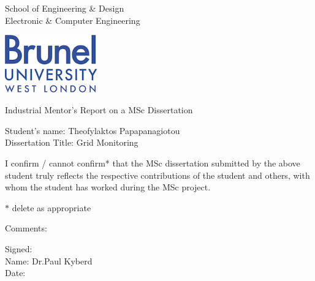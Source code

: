 \newpage
\thispagestyle{empty}
\begin{center}
\Large
School of Engineering \& Design\\
Electronic \& Computer Engineering\\
\vspace{0.5\baselineskip}
\begin{center}
\includegraphics[width=40mm]{images/brunel_logo}\\
\end{center}
\Large
Industrial Mentor's Report on a MSc Dissertation\\
\end{center}
\Large
\vspace{0.5\baselineskip}
Student's name: Theofylaktos Papapanagiotou
\\
Dissertation Title: Grid Monitoring

\vspace{0.5\baselineskip}
\large
\noindent

I confirm / cannot confirm* that the MSc dissertation submitted by the above student
truly reflects the respective contributions of the student and others, with whom the
student has worked during the MSc project.

\vspace{0.5\baselineskip}
$*$ delete as appropriate

\vspace{1\baselineskip}
Comments:


\vspace{2.5\baselineskip}
\noindent
Signed:\\
Name: Dr.Paul Kyberd\\
Date: